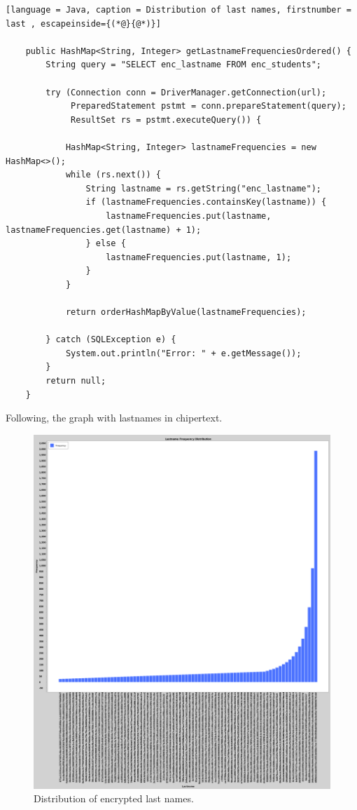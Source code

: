 \begin{lstlisting}[language = Java, caption = Distribution of last names, firstnumber = last , escapeinside={(*@}{@*)}]

    public HashMap<String, Integer> getLastnameFrequenciesOrdered() {
        String query = "SELECT enc_lastname FROM enc_students";

        try (Connection conn = DriverManager.getConnection(url);
             PreparedStatement pstmt = conn.prepareStatement(query);
             ResultSet rs = pstmt.executeQuery()) {

            HashMap<String, Integer> lastnameFrequencies = new HashMap<>();
            while (rs.next()) {
                String lastname = rs.getString("enc_lastname");
                if (lastnameFrequencies.containsKey(lastname)) {
                    lastnameFrequencies.put(lastname, lastnameFrequencies.get(lastname) + 1);
                } else {
                    lastnameFrequencies.put(lastname, 1);
                }
            }
            
            return orderHashMapByValue(lastnameFrequencies);

        } catch (SQLException e) {
            System.out.println("Error: " + e.getMessage());
        }
        return null;
    }
\end{lstlisting}

Following, the graph with lastnames in chipertext.

\begin{figure}[h!]
    \centering
    \includegraphics[width=\textwidth]{03-ex2/Lastname_Frequency_Distribution.png}
    \caption{Distribution of encrypted last names.}
    \label{fig:Distribution-of-last-names}
\end{figure}

